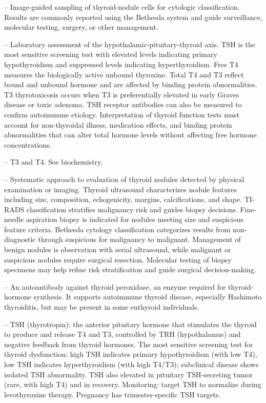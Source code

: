 -- Image-guided sampling of thyroid-nodule cells for cytologic classification. Results are commonly reported using the Bethesda system and guide surveillance, molecular testing, surgery, or other management.

-- Laboratory assessment of the hypothalamic-pituitary-thyroid axis. TSH is the most sensitive screening test with elevated levels indicating primary hypothyroidism and suppressed levels indicating hyperthyroidism. Free T4 measures the biologically active unbound thyroxine. Total T4 and T3 reflect bound and unbound hormone and are affected by binding protein abnormalities. T3 thyrotoxicosis occurs when T3 is preferentially elevated in early Graves disease or toxic adenoma. TSH receptor antibodies can also be measured to confirm autoimmune etiology. Interpretation of thyroid function tests must account for non-thyroidal illness, medication effects, and binding protein abnormalities that can alter total hormone levels without affecting free hormone concentrations.

-- T3 and T4. See biochemistry.

-- Systematic approach to evaluation of thyroid nodules detected by physical examination or imaging. Thyroid ultrasound characterizes nodule features including size, composition, echogenicity, margins, calcifications, and shape. TI-RADS classification stratifies malignancy risk and guides biopsy decisions. Fine-needle aspiration biopsy is indicated for nodules meeting size and suspicious feature criteria. Bethesda cytology classification categorizes results from non-diagnostic through suspicious for malignancy to malignant. Management of benign nodules is observation with serial ultrasound, while malignant or suspicious nodules require surgical resection. Molecular testing of biopsy specimens may help refine risk stratification and guide surgical decision-making.

-- An autoantibody against thyroid peroxidase, an enzyme required for thyroid-hormone synthesis. It supports autoimmune thyroid disease, especially Hashimoto thyroiditis, but may be present in some euthyroid individuals.

-- TSH (thyrotropin): the anterior pituitary hormone that stimulates the thyroid to produce and release T4 and T3, controlled by TRH (hypothalamus) and negative feedback from thyroid hormones. The most sensitive screening test for thyroid dysfunction: high TSH indicates primary hypothyroidism (with low T4), low TSH indicates hyperthyroidism (with high T4/T3); subclinical disease shows isolated TSH abnormality. TSH also elevated in pituitary TSH-secreting tumor (rare, with high T4) and in recovery. Monitoring: target TSH to normalize during levothyroxine therapy. Pregnancy has trimester-specific TSH targets.

